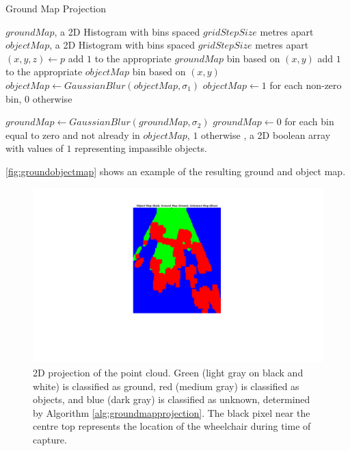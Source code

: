 \begin{algorithm}
\caption{Ground Map Projection}
\label{alg:groundmapprojection}
\begin{algorithmic}[1]
\Statex
{}
    \State $groundMap$, a 2D Histogram with bins spaced $gridStepSize$ metres apart
    \State $objectMap$, a 2D Histogram with bins spaced $gridStepSize$ metres apart
        \State $(x,y,z) \gets p$
            \State add $1$ to the appropriate $groundMap$ bin based on $(x,y)$
        \Else
            \State add $1$ to the appropriate $objectMap$ bin based on $(x,y)$
        \EndIf
    \EndFor
    \State $objectMap \gets GaussianBlur(objectMap, \sigma_1)$
    \State $objectMap \gets 1$ for each non-zero bin, $0$ otherwise

    \State $groundMap \gets GaussianBlur(groundMap, \sigma_2)$
    \State $groundMap \gets 0$ for each bin equal to zero and not already in $objectMap$, $1$ otherwise
\EndFunction
\Statex
{}, a 2D boolean array with values of $1$ representing
impassible objects.
\end{algorithmic}
\end{algorithm}

\autoref{fig:groundobjectmap} shows an example of the resulting ground and
object map.

\begin{figure}
\centering
\includegraphics[width=5in]{figures/groundobjectmap.png}
\caption{2D projection of the point cloud. Green (light gray on black and white)
is classified as ground, red (medium gray) is classified as objects, and blue
(dark gray) is classified as unknown, determined by Algorithm
\autoref{alg:groundmapprojection}. The black pixel near the centre top
represents the location of the wheelchair during time of capture.}
\label{fig:groundobjectmap}
\end{figure}

